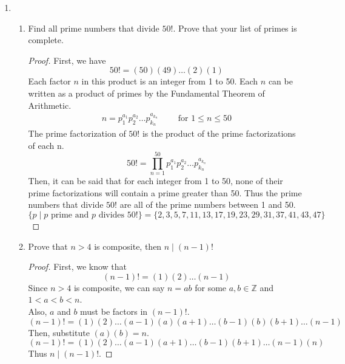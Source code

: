 \documentclass[11pt]{article}
\newcommand{\ZZ}{\mathbb{Z}}
\begin{document}
\begin{enumerate}
    \item
        \begin{enumerate}
            \item Find all prime numbers that divide $50!$. Prove that your list of primes
            is complete.
            \begin{proof}
                First, we have
                \[ 50! = (50)(49)\dots(2)(1) \]
                Each factor $n$ in this product is an integer from 1 to 50. 
                Each $n$ can be written as a product 
                of primes by the Fundamental Theorem of Arithmetic. 
                \begin{align*}
                    n = p_1^{a_1}p_2^{a_2}\dots p_{k_n}^{a_{k_n}} \qquad\text{ for } 1\le n\le 50
                \end{align*}
                The prime factorization of $50!$ is the product of the prime factorizations
                of each n.
                \[
                    50! = \prod_{n=1}^{50} p_1^{a_1}p_2^{a_2}\dots p_{k_n}^{a_{k_n}}
                \]
                Then, it can be said that for each integer from 1 to 50, none of their
                prime factorizations will contain a prime greater than 50. 
                Thus the prime numbers that divide $50!$ are all of the prime numbers between 1 and 50.
                \[
                    \{p\mid p \text{ prime and } p \text{ divides }50!\}=\{2,3,5,7,11,13,17,19,23,29,31,37,41,43,47\}
                \]
            \end{proof}

            \item Prove that $n>4$ is composite, then $n\mid (n-1)!$
            \begin{proof}
                First, we know that
                \[
                    (n-1)! = (1)(2)\dots(n-1)
                \]
                Since $n>4$ is composite, we can say $n=ab$ for some $a,b\in\ZZ$ and $1<a<b<n$. \\
                Also, $a$ and $b$ must be factors in $(n-1)!$.
                \[
                    (n-1)! = (1)(2)\dots(a-1)(a)(a+1)\dots(b-1)(b)(b+1)\dots(n-1)
                \]
                Then, substitute $(a)(b)=n$.
                \[
                    (n-1)! = (1)(2)\dots(a-1)(a+1)\dots(b-1)(b+1)\dots(n-1)(n) 
                \]
                Thus $n\mid(n-1)!$.
            \end{proof}
        \end{enumerate}


\end{enumerate}
\end{document}
